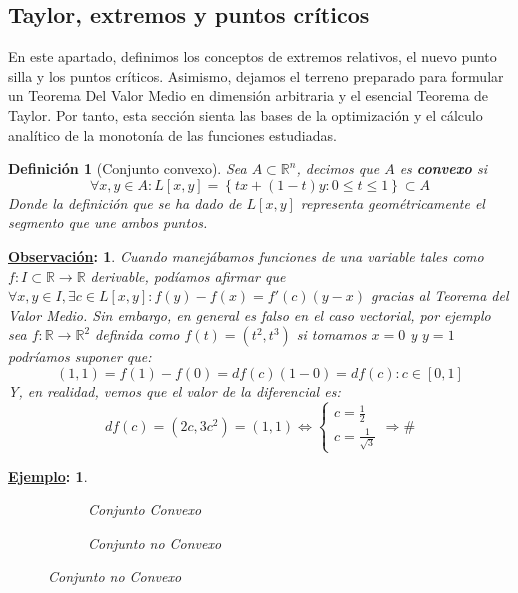 \documentclass[10pt,a4paper,openright]{book}
\theoremstyle{break}
\newtheorem*{defi}{Definición}
\newtheorem*{obs}{\underline{Observación}:}
\newtheorem*{ej}{\underline{Ejemplo}:}
\begin{document}
\subsection{Taylor, extremos y puntos críticos}
En este apartado, definimos los conceptos de extremos relativos, el nuevo punto silla y los puntos críticos. Asimismo, dejamos el terreno preparado para formular un Teorema Del Valor Medio en dimensión arbitraria y el esencial Teorema de Taylor. Por tanto, esta sección sienta las bases de la optimización y el cálculo analítico de la monotonía de las funciones estudiadas.

\begin{defi}[Conjunto convexo]
Sea $A \subset \mathbb{R}^n$, decimos que $A$ es \textbf{convexo} si 
$$\forall x,y \in A : L[x,y] = \left\lbrace tx + (1-t) y : 0 \leq t \leq 1 \right\rbrace \subset A$$
Donde la definición que se ha dado de $L[x,y]$ representa geométricamente el segmento que une ambos puntos.
\end{defi}
	    
\begin{obs}
Cuando manejábamos funciones de una variable tales como $f: I \subset \mathbb{R} \to \mathbb{R}$ derivable, podíamos afirmar que $\forall x,y \in I, \exists c \in L[x,y] : f(y) - f(x) = f'(c)(y-x)$ gracias al Teorema del Valor Medio. Sin embargo, en general es falso en el caso vectorial, por ejemplo sea $f: \mathbb{R} \to \mathbb{R}^2$ definida como $f(t)=(t^2, t^3)$ si tomamos $x = 0$ y $y=1$ podríamos suponer que:
$$(1,1) = f(1) - f(0) = df(c)(1-0) = df(c) : c \in [0,1]$$
Y, en realidad, vemos que el valor de la diferencial es:
$$df(c) = (2c,3c^2) = (1,1) \Leftrightarrow \begin{cases} c = \frac{1}{2} \\ c = \frac{1}{\sqrt{3}}\end{cases} \Rightarrow \#$$
\end{obs}
\newpage

\begin{ej}
    \begin{figure}[h]
    \centering
    
    \begin{subfigure}[h]{0.23\textwidth}
    \caption{Conjunto Convexo}
    \end{subfigure}
    \hspace{2cm}
    \begin{subfigure}[h]{0.25\textwidth}
    \caption{Conjunto no Convexo}
    \end{subfigure}
	\end{figure}
\end{ej}
\end{document}
